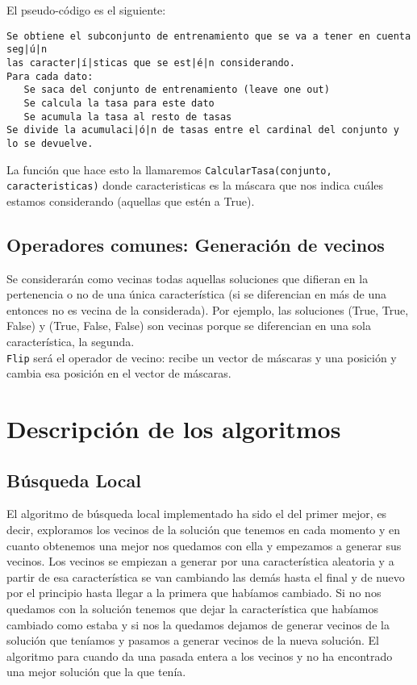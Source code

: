 \documentclass[12pt]{article}
\begin{document}
El pseudo-código es el siguiente:\\
\begin{lstlisting}
Se obtiene el subconjunto de entrenamiento que se va a tener en cuenta seg|ú|n 
las caracter|í|sticas que se est|é|n considerando.
Para cada dato:
   Se saca del conjunto de entrenamiento (leave one out)
   Se calcula la tasa para este dato
   Se acumula la tasa al resto de tasas
Se divide la acumulaci|ó|n de tasas entre el cardinal del conjunto y 
lo se devuelve.
\end{lstlisting}
La función que hace esto la llamaremos \texttt{CalcularTasa(conjunto, caracteristicas)} donde caracteristicas es la máscara que nos indica cuáles estamos considerando (aquellas que estén a True).

\subsection{Operadores comunes: Generación de vecinos}
Se considerarán como vecinas todas aquellas soluciones que difieran en la pertenencia o no de una única característica (si se diferencian en más de una entonces no es vecina de la considerada). Por ejemplo, las soluciones (True, True, False) y (True, False, False) son vecinas porque se diferencian en una sola característica, la segunda.\\
\texttt{Flip} será el operador de vecino: recibe un vector de máscaras y una posición y cambia esa posición en el vector de máscaras.\\

\newpage

\section{Descripción de los algoritmos}

\subsection{Búsqueda Local}
El algoritmo de búsqueda local implementado ha sido el del primer mejor, es decir, exploramos los vecinos de la solución que tenemos en cada momento y en cuanto obtenemos una mejor nos quedamos con ella y empezamos a generar sus vecinos. Los vecinos se empiezan a generar por una característica aleatoria y a partir de esa característica se van cambiando las demás hasta el final y de nuevo por el principio hasta llegar a la primera que habíamos cambiado. Si no nos quedamos con la solución tenemos que dejar la característica que habíamos cambiado como estaba y si nos la quedamos dejamos de generar vecinos de la solución que teníamos y pasamos a generar vecinos de la nueva solución. El algoritmo para cuando da una pasada entera a los vecinos y no ha encontrado una mejor solución que la que tenía.\\
\end{document}
